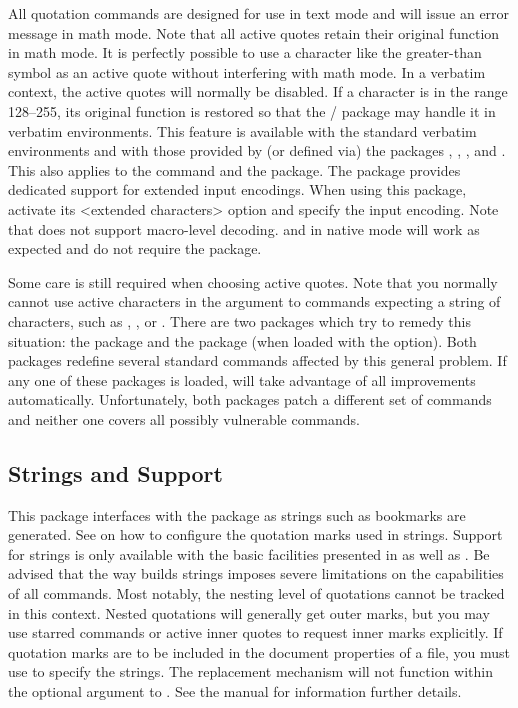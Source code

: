 \documentclass{ltxdockit}[2010/09/26]
\begin{document}
All quotation commands are designed for use in text mode and will issue an error message in math mode. Note that all active quotes retain their original function in math mode. It is perfectly possible to use a character like the greater-than symbol as an active quote without interfering with math mode. In a verbatim context, the active quotes will normally be disabled. If a character is in the range 128--255, its original function is restored so that the \slash {} package may handle it in verbatim environments. This feature is available with the standard verbatim environments and with those provided by (or defined via) the packages , , , and . This also applies to the  command and the  package. The  package provides dedicated support for extended input encodings. When using this package, activate its <extended characters> option and specify the input encoding. Note that  does not support macro-level \utf decoding. \xetex and \luatex in native \utf mode will work as expected and do not require the  package.

Some care is still required when choosing active quotes. Note that you normally cannot use active characters in the argument to commands expecting a string of characters, such as , , or . There are two packages which try to remedy this situation: the  package and the  package (when loaded with the  option). Both packages redefine several standard commands affected by this general problem. If any one of these packages is loaded,  will take advantage of all improvements automatically. Unfortunately, both packages patch a different set of commands and neither one covers all possibly vulnerable commands.

\subsection{\pdf Strings and  Support}
\label{hnt:pdf}

This package interfaces with the  package as \pdf strings such as bookmarks are generated. See  on how to configure the quotation marks used in \pdf strings. Support for \pdf strings is only available with the basic facilities presented in  as well as . Be advised that the way  builds \pdf strings imposes severe limitations on the capabilities of all commands. Most notably, the nesting level of quotations cannot be tracked in this context. Nested quotations will generally get outer marks, but you may use starred commands or active inner quotes to request inner marks explicitly. If quotation marks are to be included in the document properties of a \pdf file, you must use  to specify the strings. The replacement mechanism will not function within the optional argument to . See the  manual for information further details.
\end{document}
